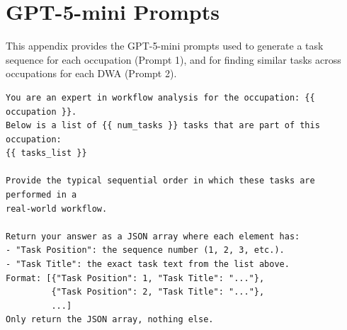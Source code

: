\section{GPT-5-mini Prompts}
\label{app:prompts}

This appendix provides the GPT-5-mini prompts used to generate a task sequence for each occupation (Prompt 1), and for finding similar tasks across occupations for each DWA (Prompt 2). \\

\begin{tcolorbox}[colback=gray!5, colframe=black!60, title={Prompt \#1: GPT-5-mini Prompt for Ordering of Tasks in Occupation}]
\begin{verbatim}
You are an expert in workflow analysis for the occupation: {{ occupation }}. 
Below is a list of {{ num_tasks }} tasks that are part of this occupation:
{{ tasks_list }}

Provide the typical sequential order in which these tasks are performed in a 
real-world workflow. 

Return your answer as a JSON array where each element has:
- "Task Position": the sequence number (1, 2, 3, etc.).
- "Task Title": the exact task text from the list above.
Format: [{"Task Position": 1, "Task Title": "..."}, 
         {"Task Position": 2, "Task Title": "..."},
         ...]
Only return the JSON array, nothing else.
\end{verbatim}
\end{tcolorbox}

